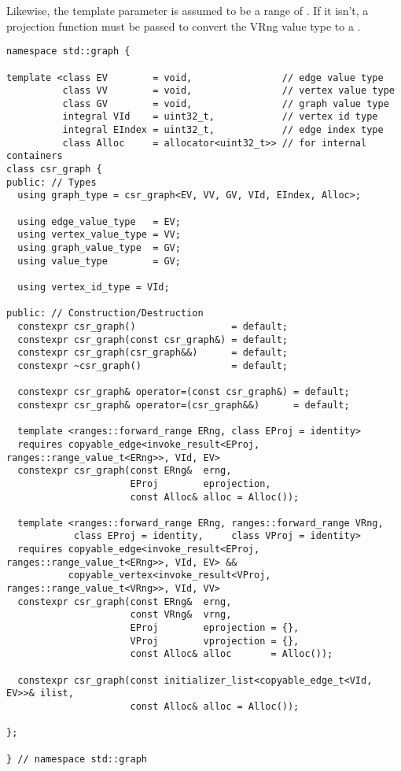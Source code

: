 Likewise, the  template parameter is assumed to be a range of . If it isn't, a  projection function must be passed to convert the VRng value type to a .


\begin{lstlisting}
namespace std::graph {

template <class EV        = void,                // edge value type
          class VV        = void,                // vertex value type
          class GV        = void,                // graph value type
          integral VId    = uint32_t,            // vertex id type
          integral EIndex = uint32_t,            // edge index type
          class Alloc     = allocator<uint32_t>> // for internal containers
class csr_graph {
public: // Types
  using graph_type = csr_graph<EV, VV, GV, VId, EIndex, Alloc>;
  
  using edge_value_type   = EV;
  using vertex_value_type = VV;
  using graph_value_type  = GV;
  using value_type        = GV;

  using vertex_id_type = VId;

public: // Construction/Destruction
  constexpr csr_graph()                 = default;
  constexpr csr_graph(const csr_graph&) = default;
  constexpr csr_graph(csr_graph&&)      = default;
  constexpr ~csr_graph()                = default;

  constexpr csr_graph& operator=(const csr_graph&) = default;
  constexpr csr_graph& operator=(csr_graph&&)      = default;

  template <ranges::forward_range ERng, class EProj = identity>
  requires copyable_edge<invoke_result<EProj, ranges::range_value_t<ERng>>, VId, EV>
  constexpr csr_graph(const ERng&  erng, 
                      EProj        eprojection, 
                      const Alloc& alloc = Alloc());

  template <ranges::forward_range ERng, ranges::forward_range VRng,
            class EProj = identity,     class VProj = identity>
  requires copyable_edge<invoke_result<EProj, ranges::range_value_t<ERng>>, VId, EV> &&
           copyable_vertex<invoke_result<VProj, ranges::range_value_t<VRng>>, VId, VV>
  constexpr csr_graph(const ERng&  erng,
                      const VRng&  vrng,
                      EProj        eprojection = {},
                      VProj        vprojection = {},
                      const Alloc& alloc       = Alloc());

  constexpr csr_graph(const initializer_list<copyable_edge_t<VId, EV>>& ilist, 
                      const Alloc& alloc = Alloc());

};

} // namespace std::graph
\end{lstlisting}

